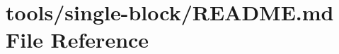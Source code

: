 \hypertarget{tools_2single-block_2_r_e_a_d_m_e_8md}{}\section{tools/single-\/block/\+R\+E\+A\+D\+ME.md File Reference}
\label{tools_2single-block_2_r_e_a_d_m_e_8md}
